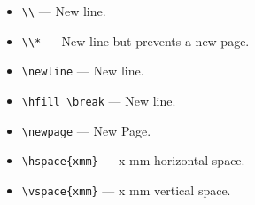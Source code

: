 \documentclass[11pt]{article}
\begin{document}
\begin{itemize}
		\item\verb=\\= --- New line.
		\item\verb=\\*= --- New line but prevents a new page.
		\item\verb=\newline= --- New line.
		\item\verb=\hfill \break= --- New line.
		\item\verb=\newpage= --- New Page.
		\item\verb=\hspace{xmm}= --- x mm horizontal space.
		\item\verb=\vspace{xmm}= --- x mm vertical space.
\end{itemize}
\end{document}
